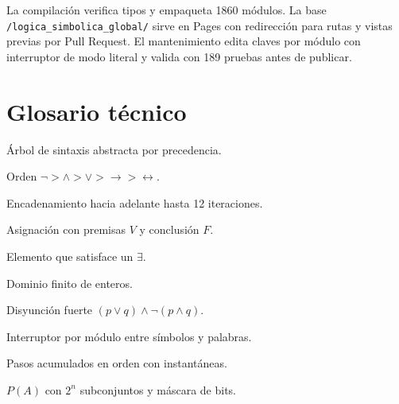 \documentclass[11pt,a4paper,openany]{book}
\begin{document}
La compilaci\'on verifica tipos y empaqueta 1860 m\'odulos. La base \texttt{/logica\_simbolica\_global/} sirve en Pages con redirecci\'on para rutas y vistas previas por Pull Request. El mantenimiento edita claves por m\'odulo con interruptor de modo literal y valida con 189 pruebas antes de publicar.

\chapter{Glosario t\'ecnico}
\label{ch:glos-tec}
\begin{description}[leftmargin=*]
\item[AST] \'Arbol de sintaxis abstracta por precedencia.
\item[Precedencia] Orden $\lnot > \land > \lor > \to > \leftrightarrow$.
\item[Forward chaining] Encadenamiento hacia adelante hasta 12 iteraciones.
\item[Contraejemplo] Asignaci\'on con premisas $V$ y conclusi\'on $F$.
\item[Testigo] Elemento que satisface un $\exists$.
\item[$D \subset \mathbb{Z}$] Dominio finito de enteros.
\item[$\Delta$] Disyunci\'on fuerte $(p \lor q) \land \lnot(p \land q)$.
\item[Modo literal] Interruptor por m\'odulo entre s\'imbolos y palabras.
\item[Trazabilidad] Pasos acumulados en orden con instant\'aneas.
\item[Potencia] $P(A)$ con $2^{n}$ subconjuntos y m\'ascara de bits.
\end{description}
\end{document}
